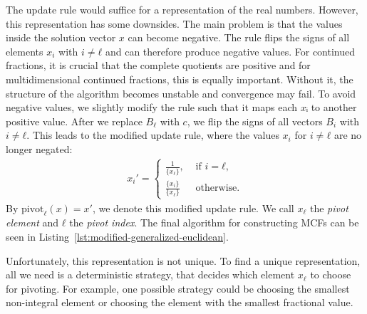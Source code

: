 The update rule would suffice for a representation of the real numbers.
However, this representation has some downsides.
The main problem is that the values inside the solution vector $x$ can become negative.
The rule flips the signs of all elements $x_i$ with $i ≠ ℓ$
and can therefore produce negative values.
For continued fractions, it is crucial that the complete quotients are positive \cite{Northshield11}
and for multidimensional continued fractions, this is equally important.
Without it, the structure of the algorithm becomes unstable and convergence may fail.
To avoid negative values, we slightly modify the rule such that it maps each $xᵢ$ to another positive value.
After we replace $B_ℓ$ with $c$, we flip the signs of all vectors $B_i$ with $i ≠ ℓ$.
This leads to the modified update rule, where the values $x_i$ for $i ≠ ℓ$ are
no longer negated:
\begin{align}
  \label{eq:modified-update-rule}
  x_i' =
  \begin{cases}
    \frac{1}{\{x_ℓ\}},  & \text{ if } i = ℓ, \\
    \frac{\{x_i\}}{\{x_ℓ\}} & \text{ otherwise.}
  \end{cases}
\end{align}
By $\mathrm{pivot}_ℓ(x) = x'$, we denote this modified update rule.
We call $x_ℓ$ the \emph{pivot element} and $ℓ$ the \emph{pivot index}.
The final algorithm for constructing MCFs can be seen in
Listing~\ref{lst:modified-generalized-euclidean}.

Unfortunately, this representation is not unique.
To find a unique representation, all we need is a deterministic strategy,
that decides which element $x_ℓ$ to choose for pivoting.
For example, one possible strategy could be choosing the smallest non-integral
element or choosing the element with the smallest fractional value.

